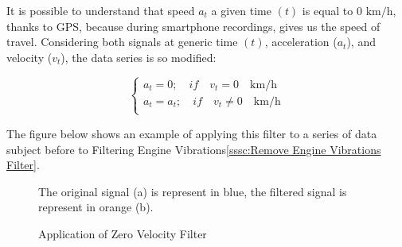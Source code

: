 \documentclass[tesi]{subfiles}
\begin{document}
It is possible to  understand that speed $a_{t}$ a given time $(t)$ is equal to $0$ $\si{\km\per\hour}$, thanks to GPS, because during smartphone recordings, gives us the speed of travel.
Considering both signals at generic time $(t)$, acceleration ($a_{t}$), and velocity ($v_{t}$), the data series is so modified:
\begin{center}
\[
    \left\{
                \begin{array}{ll}
                  a_{t} = 0; \quad 	if \quad v_{t} = 0 \quad \si{\km\per\hour}\\
                  a_{t} = a_{t}; \quad 	if \quad v_{t} \neq 0 \quad \si{\km\per\hour}\\
                \end{array}
              \right.
\]
\end{center}

The figure below shows an example of applying this filter to a series of data subject before to Filtering Engine Vibrations\ref{sssc:Remove Engine Vibrations Filter}.

\begin{figure}[H]	

\centering
{}

The original signal (a) is represent in blue, the filtered signal is represent in orange (b).

 \caption{Application of Zero Velocity Filter}
  \label{fig:Application of Zero Velocity Filter.}
\end{figure}
\end{document}
